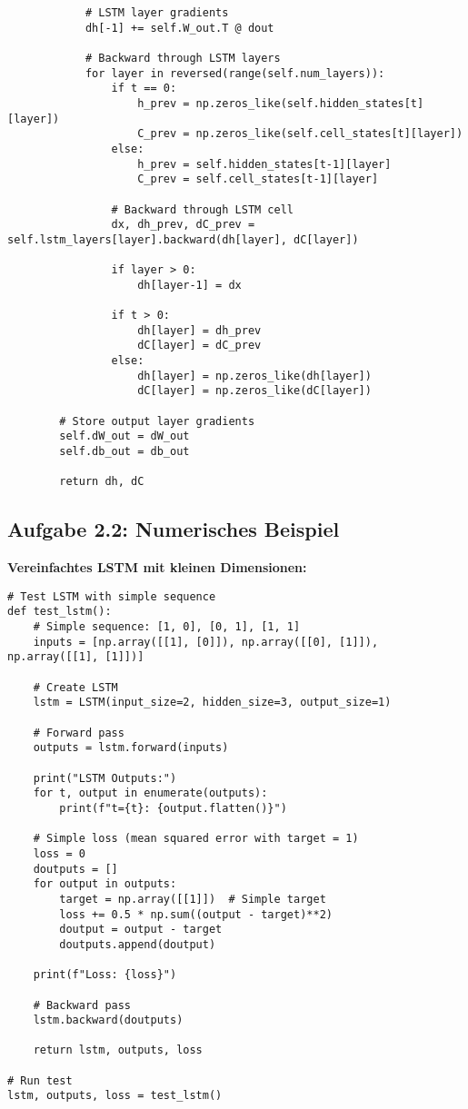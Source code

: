 ﻿\documentclass[12pt,a4paper]{article}
\begin{document}
\begin{lstlisting}
            # LSTM layer gradients
            dh[-1] += self.W_out.T @ dout
            
            # Backward through LSTM layers
            for layer in reversed(range(self.num_layers)):
                if t == 0:
                    h_prev = np.zeros_like(self.hidden_states[t][layer])
                    C_prev = np.zeros_like(self.cell_states[t][layer])
                else:
                    h_prev = self.hidden_states[t-1][layer]
                    C_prev = self.cell_states[t-1][layer]
                
                # Backward through LSTM cell
                dx, dh_prev, dC_prev = self.lstm_layers[layer].backward(dh[layer], dC[layer])
                
                if layer > 0:
                    dh[layer-1] = dx
                
                if t > 0:
                    dh[layer] = dh_prev
                    dC[layer] = dC_prev
                else:
                    dh[layer] = np.zeros_like(dh[layer])
                    dC[layer] = np.zeros_like(dC[layer])
        
        # Store output layer gradients
        self.dW_out = dW_out
        self.db_out = db_out
        
        return dh, dC
\end{lstlisting}

\subsection{Aufgabe 2.2: Numerisches Beispiel}

\textbf{Vereinfachtes LSTM mit kleinen Dimensionen:}

\begin{lstlisting}
# Test LSTM with simple sequence
def test_lstm():
    # Simple sequence: [1, 0], [0, 1], [1, 1]
    inputs = [np.array([[1], [0]]), np.array([[0], [1]]), np.array([[1], [1]])]
    
    # Create LSTM
    lstm = LSTM(input_size=2, hidden_size=3, output_size=1)
    
    # Forward pass
    outputs = lstm.forward(inputs)
    
    print("LSTM Outputs:")
    for t, output in enumerate(outputs):
        print(f"t={t}: {output.flatten()}")
    
    # Simple loss (mean squared error with target = 1)
    loss = 0
    doutputs = []
    for output in outputs:
        target = np.array([[1]])  # Simple target
        loss += 0.5 * np.sum((output - target)**2)
        doutput = output - target
        doutputs.append(doutput)
    
    print(f"Loss: {loss}")
    
    # Backward pass
    lstm.backward(doutputs)
    
    return lstm, outputs, loss

# Run test
lstm, outputs, loss = test_lstm()
\end{lstlisting}
\end{document}
